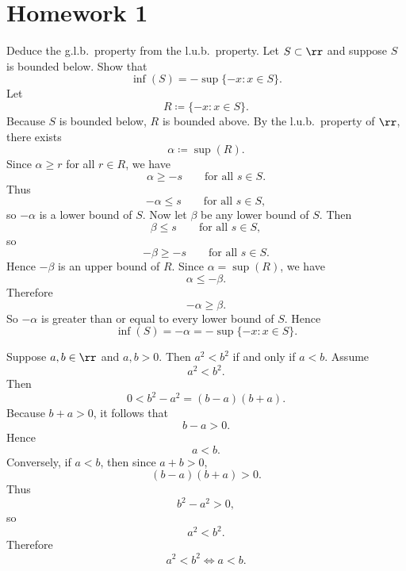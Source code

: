 
\section{Homework 1}

\begin{problem}{
    Deduce the g.l.b.\ property from the l.u.b.\ property.
    Let $S\subset\rr$ and suppose $S$ is bounded below.
    Show that
    \[
        \inf(S)=-\sup\{-x:x\in S\}.
    \]
}
    Let
    \[
        R\coloneqq\{-x:x\in S\}.
    \]
    Because $S$ is bounded below, $R$ is bounded above.
    By the l.u.b.\ property of $\rr$, there exists
    \[
        \alpha\coloneqq\sup(R).
    \]
    Since $\alpha\geq r$ for all $r\in R$, we have
    \[
        \alpha\geq -s
        \qquad\text{for all } s\in S.
    \]
    Thus
    \[
        -\alpha\leq s
        \qquad\text{for all } s\in S,
    \]
    so $-\alpha$ is a lower bound of $S$.
    Now let $\beta$ be any lower bound of $S$.
    Then
    \[
        \beta\leq s
        \qquad\text{for all } s\in S,
    \]
    so
    \[
        -\beta\geq -s
        \qquad\text{for all } s\in S.
    \]
    Hence $-\beta$ is an upper bound of $R$.
    Since $\alpha=\sup(R)$, we have
    \[
        \alpha\leq -\beta.
    \]
    Therefore
    \[
        -\alpha\geq \beta.
    \]
    So $-\alpha$ is greater than or equal to every lower bound of $S$.
    Hence
    \[
        \inf(S)=-\alpha=-\sup\{-x:x\in S\}.
    \]
\end{problem}

\begin{problem}{
    Suppose $a,b\in\rr$ and $a,b>0$.
    Then $a^2<b^2$ if and only if $a<b$.
}
    Assume
    \[
        a^2<b^2.
    \]
    Then
    \[
        0<b^2-a^2=(b-a)(b+a).
    \]
    Because $b+a>0$, it follows that
    \[
        b-a>0.
    \]
    Hence
    \[
        a<b.
    \]
    Conversely, if $a<b$, then since $a+b>0$,
    \[
        (b-a)(b+a)>0.
    \]
    Thus
    \[
        b^2-a^2>0,
    \]
    so
    \[
        a^2<b^2.
    \]
    Therefore
    \[
        a^2<b^2 \iff a<b.
    \]
\end{problem}